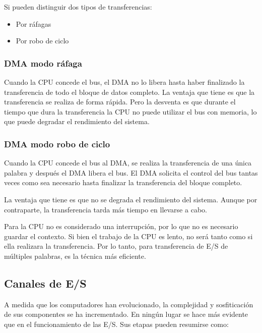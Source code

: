 Si pueden distinguir dos tipos de transferencias:

\begin{itemize}
  \item Por ráfagas
  \item Por robo de ciclo
\end{itemize}

\begin{subs}
  \subsubsection{DMA modo ráfaga}

  Cuando la CPU concede el bus, el DMA no lo libera hasta haber finalizado la transferencia de todo el bloque de datos completo. La ventaja que tiene es que la transferencia se realiza de forma rápida. Pero la desventa es que durante el tiempo que dura la transferencia la CPU no puede utilizar el bus con memoria, lo que puede degradar el rendimiento del sistema.

  \subsubsection{DMA modo robo de ciclo}

  Cuando la CPU concede el bus al DMA, se realiza la transferencia de una única palabra y después el DMA libera el bus. El DMA solicita el control del bus tantas veces como sea necesario hasta finalizar la transferencia del bloque completo.

  La ventaja que tiene es que no se degrada el rendimiento del sistema. Aunque por contraparte, la transferencia tarda más tiempo en llevarse a cabo.

  Para la CPU no es considerado una interrupción, por lo que no es necesario guardar el contexto. Si bien el trabajo de la CPU es lento, no será tanto como si ella realizara la transferencia. Por lo tanto, para transferencia de E/S de múltiples palabras, es la técnica más eficiente.

\end{subs}

\subsection{Canales de E/S}

A medida que los computadores han evolucionado, la complejidad y sosfiticación de sus componentes se ha incrementado. En ningún lugar se hace más evidente que en el funcionamiento de las E/S. Sus etapas pueden resumirse como:


